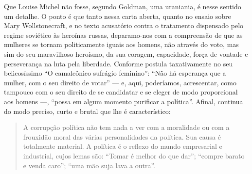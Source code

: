 Que Louise Michel não fosse, segundo Goldman, uma uraniania, é nesse
sentido um detalhe. O ponto é que tanto nessa carta aberta, quanto no
ensaio sobre Mary Wollstonecraft, e no texto acusatório contra o
tratamento dispensado pelo regime soviético às heroínas russas,
deparamo-nos com a compreensão de que as mulheres se tornam
politicamente iguais aos homens, não através do voto, mas sim do seu
maravilhoso heroísmo, da sua coragem, capacidade, força de vontade e
perseverança na luta pela liberdade. Conforme postula taxativamente no
seu belicosíssimo ``O camaleônico sufrágio feminino'': ``Não há
esperança que a mulher, com o seu direito de votar'' --- e, aqui,
poderíamos, acrescentar, como tampouco com o seu direito de se
candidatar e se eleger de modo proporcional aos homens ---, ``possa em
algum momento purificar a política''. Afinal, continua do modo preciso,
curto e brutal que lhe é característico:

\begin{quote}
A corrupção política não tem nada a ver com a moralidade ou com a
frouxidão moral das várias personalidades da política. Sua causa é
totalmente material. A política é o reflexo do mundo empresarial e
industrial, cujos lemas são: ``Tomar é melhor do que dar''; ``compre
barato e venda caro''; ``uma mão suja lava a outra''.
\end{quote}

